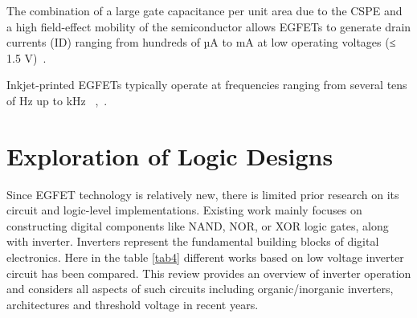 The combination of a large gate capacitance per unit area due to the CSPE and a high field-effect mobility of the semiconductor allows EGFETs to generate drain currents (ID) ranging from hundreds of µA to mA at low operating voltages (≤ 1.5 V)~\cite{ref80}.

Inkjet-printed EGFETs typically operate at frequencies ranging from several tens of Hz up to kHz ~\cite{ref77},~\cite{ref78}.



\section{Exploration of Logic Designs}
Since EGFET technology is relatively new, there is limited prior research on its circuit and logic-level implementations. Existing work mainly focuses on constructing digital components like NAND, NOR, or XOR logic gates, along with inverter.
Inverters represent the fundamental building blocks of digital electronics. Here in the table \ref{tab4} different works based on low voltage inverter circuit has been compared.
This review provides an
overview of inverter operation and considers all aspects of such circuits including organic/inorganic inverters, architectures and threshold voltage in recent years.

